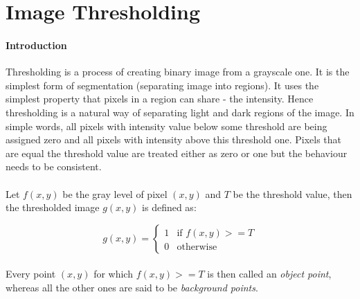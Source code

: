\paragraph{}

\section{Image Thresholding}
\paragraph{Introduction}
Thresholding is a process of creating binary image from a grayscale one.\cite{digital-image-processing} It is the simplest form of segmentation (separating image into regions). It uses the simplest property that pixels in a region can share - the intensity. Hence thresholding is a natural way of separating light and dark regions of the image. In simple words, all pixels with intensity value below some threshold are being assigned zero and all pixels with intensity above this threshold one. Pixels that are equal the threshold value are treated either as zero or one but the behaviour needs to be consistent. 

\paragraph{}
Let $f(x, y)$ be the gray level of pixel $(x, y)$ and $T$ be the threshold value, then the thresholded image $g(x, y)$ is defined as:

\begin{equation}
	g(x, y) = \begin{cases}
		1 & \text{if $f(x, y) >= T$}\\
		0 & \text{otherwise}
	\end{cases}
\end{equation}

\paragraph{}
Every point $(x, y)$ for which $f(x, y) >= T$ is then called an \textit{object point}, whereas all the other ones are said to be \textit{background points}.


